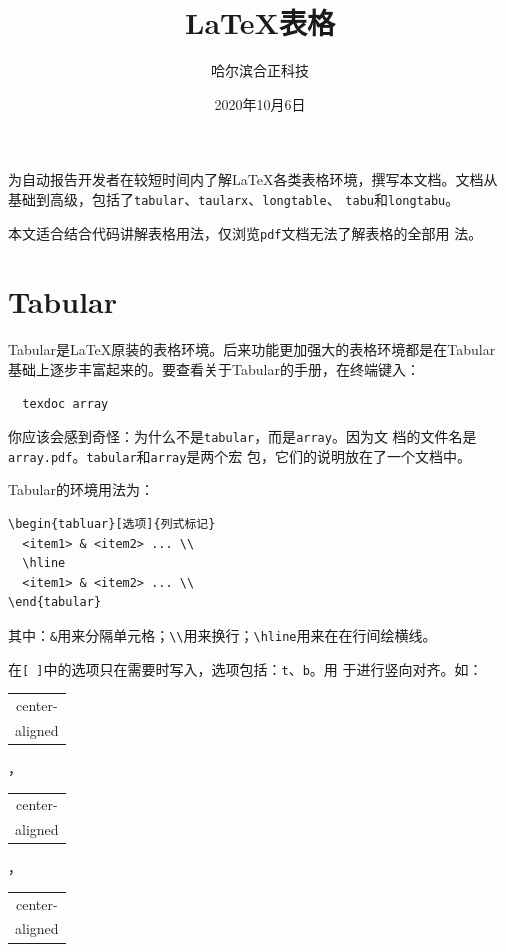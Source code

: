 \documentclass{article}
\title{\LaTeX{}表格}
\author{哈尔滨合正科技}
\date{2020年10月6日}
\begin{document}
\maketitle
为自动报告开发者在较短时间内了解\LaTeX{}各类表格环境，撰写本文档。文档从
基础到高级，包括了\texttt{tabular}、\texttt{taularx}、\texttt{longtable}、
\texttt{tabu}和\texttt{longtabu}。

本文适合结合代码讲解表格用法，仅浏览\texttt{pdf}文档无法了解表格的全部用
法。

\section{Tabular}

Tabular是\LaTeX{}原装的表格环境。后来功能更加强大的表格环境都是在Tabular
基础上逐步丰富起来的。要查看关于Tabular的手册，在终端键入：

\begin{verbatim}
  texdoc array
\end{verbatim}

你应该会感到奇怪：为什么不是\texttt{tabular}，而是\texttt{array}。因为文
档的文件名是\texttt{array.pdf}。\texttt{tabular}和\texttt{array}是两个宏
包，它们的说明放在了一个文档中。

Tabular的环境用法为：

\begin{verbatim}
\begin{tabluar}[选项]{列式标记}
  <item1> & <item2> ... \\
  \hline
  <item1> & <item2> ... \\
\end{tabular}
\end{verbatim}
其中：\verb!&!用来分隔单元格；\verb!\\!用来换行；\verb!\hline!用来在在行间绘横线。

在\verb![ ]!中的选项只在需要时写入，选项包括：\texttt{t}、\texttt{b}。用
于进行竖向对齐。如：

\begin{tabular}{|c|}
center-\\ aligned \\
\end{tabular}
，
\begin{tabular}[t]{|c|}
center-\\ aligned \\
\end{tabular}
，
\begin{tabular}[b]{|c|}
center-\\ aligned \\
\end{tabular}
\end{document}
